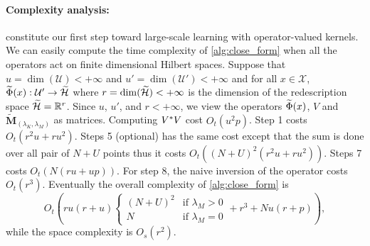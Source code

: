 \paragraph{Complexity analysis:}
 constitute our first step toward large-scale learning with operator-valued kernels. We can easily compute the time complexity of \cref{alg:close_form} when all the operators act on finite dimensional Hilbert spaces. Suppose that $u=\dim(\mathcal{U})<+\infty$ and $u'=\dim(\mathcal{U}')<+\infty$ and for all $x\in\mathcal{X}$, $\widetilde{\Phi}(x):\mathcal{U}'\to\widetilde{\mathcal{H}}$ where $r=\dim(\widetilde{\mathcal{H}})<+\infty$ is the dimension of the redescription space $\widetilde{\mathcal{H}}=\mathbb{R}^{r}$. Since $u$, $u'$, and $r<+\infty$, we view the operators $\widetilde{\Phi}(x)$, $V$ and $\mathbf{\widetilde{M}}_{\left(\lambda_K,\lambda_M\right)}$ as matrices. Computing $V^* V$ cost $O_t(u^2p)$. Step 1 costs $O_t(r^2u + ru^2)$. Steps 5 (optional) has the same cost except that the sum is done over all pair of $N+U$ points thus it costs $O_t((N+U)^2(r^2u + r u^2))$. Steps 7 costs $O_t(N(ru + up))$. For step 8, the naive inversion of the operator costs $O_t(r^3)$. Eventually the overall complexity of \cref{alg:close_form} is
\begin{dmath*}
O_t\left(ru(r + u) \begin{cases} (N+U)^2 & \text{if $\lambda_M > 0$} \\ N & \text{if $\lambda_M = 0$} \end{cases}+ r^3 + Nu(r+p)
\right),
\end{dmath*}
while the space complexity is $O_s(r^2)$.

